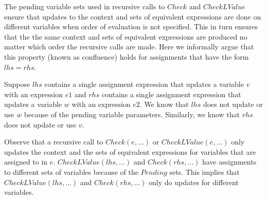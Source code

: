 The pending variable sets used in recursive calls to $Check$ and $CheckLValue$
ensure that updates to the context and sets of equivalent expressions are done on different variables when order
of evaluation is not specified.  This in turn ensures that the the same context and sets of equivalent expressions
are produced no matter which order the recursive calls are made.   Here we informally argue 
that this property (known as confluence) holds for assignments that have  the form $lhs = rhs$.

Suppose $lhs$
contains a single assignment expression that updates a variable $v$ with an expression $e1$ and 
$rhs$ contains a single assignment expression that updates  a variable $w$ with an expression $e2$.  
We know that $lhs$ does not update or use $w$ because of the pending variable parameters.  Similarly, 
we know that $rhs$ does not update or use $v$.

Observe that a recursive call to $Check(e, \ldots)$ or $CheckLValue(e, \ldots)$  only updates the context
and the sets of equivalent expressions for variables that are assigned to in $e$.   $CheckLValue(lhs,\ldots)$ and
$Check(rhs, \ldots)$ have assignments to different sets of variables because of the $Pending$ sets.  This
implies that $CheckLValue(lhs,\ldots)$ and $Check(rhs, \ldots)$ only do updates for different variables.

